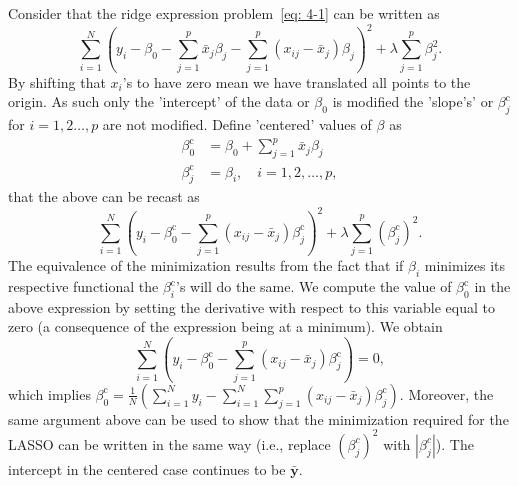 \documentclass[10pt]{article}
\begin{document}
\begin{enumerate}[1.]
        \sol
        Consider that the ridge expression problem~\eqref{eq: 4-1} can be written as 
        \begin{equation}\label{eq: ridge_rewrite}
        	\sum_{i=1}^{N}\left( y_i - \beta_{0} - \sum_{j=1}^{p}\bar{x}_{j}\beta_{j}- \sum_{j=1}^{p}(x_{ij}-\bar{x}_{j})\beta_{j}\right) ^{2} + \lambda \sum_{j=1}^{p}\beta_{j}^{2}.
        \end{equation}
        By shifting that $x_{i}$'s to have zero mean we have translated all points to the origin. As such only the 'intercept' of the data or $\beta_0$ is modified the 'slope's' or $\beta_{j}^{\textrm{c}}$ for $i=1,2\ldots,p$ are not modified. Define 'centered' values of $\beta$ as
        \begin{equation*}
        	\begin{aligned}
        		\beta_{0}^{\textrm{c}} &= \beta_{0} + \sum_{j=1}^{p}\bar{x}_{j}\beta_{j}\\
        		\beta_{j}^{\textrm{c}} &= \beta_{i},\quad i= 1,2,\ldots,p,
        	\end{aligned}
        \end{equation*}
        that the above can be recast as 
        \begin{equation*}
        	\sum_{i=1}^{N}\left( y_i - \beta_{0}^{\textrm{c}} - \sum_{j=1}^{p}(x_{ij}-\bar{x}_{j})\beta_{j}^{\textrm{c}}\right) ^{2} + \lambda \sum_{j=1}^{p}(\beta_{j}^{\textrm{c}})^{2}.
        \end{equation*}
        The equivalence of the minimization results from the fact that if $\beta_{i}$
        minimizes its respective functional the $\beta_{i}^{\textrm{c}}$'s will do the same. We compute the value of $\beta_{0}^{\textrm{c}}$ in the above expression by setting the derivative with respect
to this variable equal to zero (a consequence of the expression being at a minimum). We obtain
        \begin{equation*}
        	\sum_{i=1}^{N}\left( y_i - \beta_{0}^{\textrm{c}} - \sum_{j=1}^{p}(x_{ij}-\bar{x}_{j})\beta_{j}^{\textrm{c}}\right) = 0, 
        \end{equation*}
        which implies $\beta_{0}^{\textrm{c}} = \frac{1}{N}\left( \sum_{i=1}^{N}y_{i} - \sum_{i=1}^N\sum_{j=1}^{p}(x_{ij} - \bar{x}_{j})\beta_{j}^{\textrm{c}}\right) $. 
        Moreover, the same argument above can be used to show that the minimization required for the LASSO can be written in the same way (i.e., replace $(\beta_{j}^{c})^{2}$ with $|\beta_{j}^{c}|$). The intercept in the centered case continues to be $\bar{\mathbf{y}}$.
        

\end{enumerate}
\end{document}
